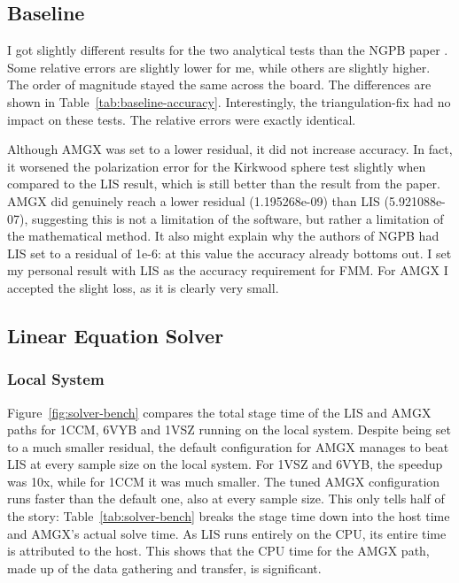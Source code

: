 \FloatBarrier

\subsection{Baseline}
\label{evaluation-results-baseline}

I got slightly different results for the two analytical tests than the NGPB paper \cite{diflorio2025nextgenpb}.
Some relative errors are slightly lower for me, while others are slightly higher.
The order of magnitude stayed the same across the board.
The differences are shown in Table~\ref{tab:baseline-accuracy}.
Interestingly, the triangulation-fix had no impact on these tests.
The relative errors were exactly identical.

Although AMGX was set to a lower residual, it did not increase accuracy.
In fact, it worsened the polarization error for the Kirkwood sphere test slightly when compared to the LIS result, which is still better than the result from the paper.
AMGX did genuinely reach a lower residual (1.195268e-09) than LIS (5.921088e-07), suggesting this is not a limitation of the software, but rather a limitation of the mathematical method.
It also might explain why the authors of NGPB had LIS set to a residual of 1e-6: at this value the accuracy already bottoms out.
I set my personal result with LIS as the accuracy requirement for FMM.
For AMGX I accepted the slight loss, as it is clearly very small.


\FloatBarrier

\subsection{Linear Equation Solver}
\label{sec:evaluation-results-lin-eq-solver}

\subsubsection{Local System}

Figure~\ref{fig:solver-bench} compares the total stage time of the LIS and AMGX paths for 1CCM, 6VYB and 1VSZ running on the local system.
Despite being set to a much smaller residual, the default configuration for AMGX manages to beat LIS at every sample size on the local system.
For 1VSZ and 6VYB, the speedup was 10x, while for 1CCM it was much smaller.
The tuned AMGX configuration runs faster than the default one, also at every sample size.
This only tells half of the story: Table~\ref{tab:solver-bench} breaks the stage time down into the host time and AMGX's actual solve time.
As LIS runs entirely on the CPU, its entire time is attributed to the host.
This shows that the CPU time for the AMGX path, made up of the data gathering and transfer, is significant.

